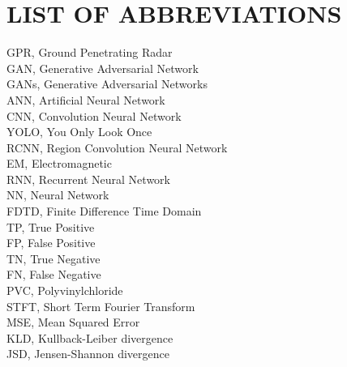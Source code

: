 \chapter*{LIST OF ABBREVIATIONS}

\begin{flushleft}
GPR, Ground Penetrating Radar\\
\vspace{\baselineskip}
GAN, Generative Adversarial Network\\
\vspace{\baselineskip}
GANs, Generative Adversarial Networks\\
\vspace{\baselineskip}
ANN, Artificial Neural Network\\
\vspace{\baselineskip}
CNN, Convolution Neural Network\\
\vspace{\baselineskip}
YOLO, You Only Look Once\\
\vspace{\baselineskip}
RCNN, Region Convolution Neural Network\\
\vspace{\baselineskip}
EM, Electromagnetic\\
\vspace{\baselineskip}
RNN, Recurrent Neural Network\\
\vspace{\baselineskip}
NN, Neural Network\\
\vspace{\baselineskip}
FDTD, Finite Difference Time Domain\\
\vspace{\baselineskip}
TP, True Positive\\
\vspace{\baselineskip}
FP, False Positive\\
\vspace{\baselineskip}
TN, True Negative\\
\vspace{\baselineskip}
FN, False Negative\\
\vspace{\baselineskip}
PVC, Polyvinylchloride\\
\vspace{\baselineskip}
STFT, Short Term Fourier Transform\\
\vspace{\baselineskip}
MSE, Mean Squared Error\\
\vspace{\baselineskip}
KLD, Kullback-Leiber divergence\\
\vspace{\baselineskip}
JSD, Jensen-Shannon divergence\\
\end{flushleft}